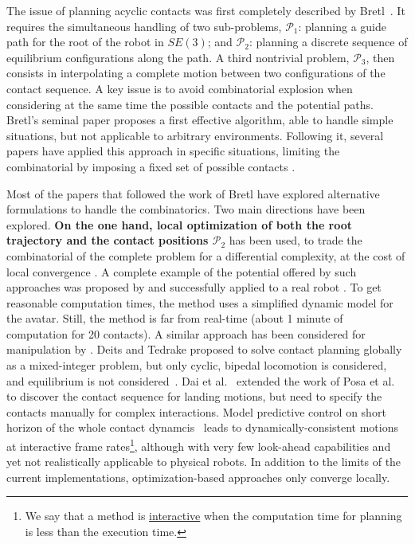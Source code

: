 The issue of planning acyclic contacts was first completely described by Bretl~\cite{Bretl:2006:MPM:1124573.1124585}. It requires the simultaneous handling of two sub-problems, $\mathcal{P}_1$: planning a guide path for the root of the robot in $SE(3)$; and $\mathcal{P}_2$: planning a discrete sequence of equilibrium configurations along the path. A third nontrivial problem, $\mathcal{P}_3$, 
then consists in interpolating a complete motion between two configurations of the contact sequence.  A key issue is to avoid combinatorial explosion when considering at the same time the possible contacts and the potential paths. Bretl's seminal paper proposes a first effective algorithm, able to handle simple situations, but not applicable to arbitrary environments. Following it, seve\-ral papers have applied this approach in specific situations, limiting the combinatorial by imposing a fixed set of possible contacts \citep{Hauser06usingmotion, stilman2010}.

Most of the papers that followed the work of Bretl have explored alternative formulations to handle the combinatorics. Two main directions have been explored. \textbf{On the one hand, local optimization of both the root trajectory \Pa and the contact positions $\mathcal{P}_2$} has been used, to trade the combinatorial of the complete problem for a differential complexity, at the cost of local convergence \citep{1631739}. A complete example of the potential offered by such approaches was proposed by \cite{Mordatch:2012:DCB:2185520.2185539} and successfully applied to a real robot \citep{mordatch2015}. To get reasonable computation times, the method uses a simplified dynamic model for the avatar. Still, the method is far from real-time  (about 1 minute of computation for 20 contacts).  A similar approach has been considered for manipulation by \cite{gabicciniisrr15}. Deits and Tedrake proposed to solve contact planning globally as a mixed-integer problem, but only cyclic, bipedal locomotion is considered, and equilibrium is not considered~\cite{DBLP:conf/humanoids/DeitsT14}. 
Dai et al.~\cite{dai2014whole} extended the work of Posa et al.~\cite{Posa:2014:DMT:2568343.2568352} to discover the contact sequence for landing motions, but need to specify
the contacts manually for complex interactions.
Model predictive control on short horizon of the whole contact dynamcis~\cite{tassa_icra14,hamalainen_cpbp_2015} leads to dynamically-consistent motions at \gls{interactive} frame rates\footnote{We say that a method is \underline{interactive} when the computation time for planning is less than the execution time.}, although with very few look-ahead capabilities and yet not realistically applicable to physical robots.
In addition to the limits of the current implementations, optimization-based approaches only converge locally.

